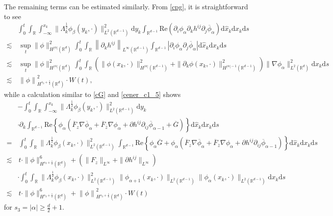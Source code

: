 \documentclass[10pt,twoside,a4paper]{article}
\numberwithin{equation}{section}\allowdisplaybreaks
\def\geq{\geqslant}
\begin{document}
The remaining terms can be estimated similarly. From \eqref{cpg}, it is straightforward to see
\begin{align} \label{cener_c1_6}
	& \int_0^t	\int_{\mathbb{R}} \int_{-\infty}^{x_k} \|\Lambda_k^{\frac 12}\phi_{\beta}(y_k,\cdot)\|^2_{L^2(\mathbb{R}^{d-1})}\mathrm{d} y_k\int_{\mathbb{R}^{d-1}}  \mathrm{Re}\left(\partial_{i} \phi_{\alpha }  \partial_k h^{ij} \partial_j \overline{\phi}_{\alpha }\right) \mathrm{d} \hat{x}_k  \mathrm{d} x_k \mathrm{d} s\nonumber\\
	\lesssim &\,   \sup_t  \|\phi\|^2_{H^{|\alpha|}(\mathbb{R}^{d})}  \int_0^t	\int_{\mathbb{R}} \left\|  \partial_k h^{ij} \right\|_{L^\infty(\mathbb{R}^{d-1})}\int_{\mathbb{R}^{d-1}}  \left|\partial_{i} \phi_{\alpha }  \partial_j \overline{\phi}_{\alpha }\right| \mathrm{d} \hat{x}_k  \mathrm{d} x_k \mathrm{d} s\\
	\lesssim &\, \sup_t  \|\phi\|^2_{H^{|\alpha|}(\mathbb{R}^{d})}\int_0^t	\int_{\mathbb{R}} \left(  \|\phi(x_k,\cdot)\|^2_{H^{|\alpha|}(\mathbb{R}^{d-1})}+\|\partial_k \phi(x_k,\cdot)\|_{H^{|\alpha|-1}(\mathbb{R}^{d-1})}^2\right) \| \nabla\phi_{\alpha}\|^2_{L^2(\mathbb{R}^d)} \mathrm{d} x_k \mathrm{d} s\nonumber\\
	\lesssim &\,\left\|  \phi\right\|_{H^{s_3+\frac 12}(\mathbb{R}^d)}^2 \cdot W (t),\nonumber
\end{align}
while a calculation similar to \eqref{cG} and \eqref{cener_c1_5} shows
\begin{align} \label{cener_c1_7}
	&	- \int_0^t	\int_{\mathbb{R}}\int_{-\infty}^{x_k} \|\Lambda_k^{\frac 12}\phi_{\beta}(y_k,\cdot)\|^2_{L^2(\mathbb{R}^{d-1})}\mathrm{d} y_k\nonumber\\
	&\cdot \partial_k\int_{\mathbb{R}^{d-1}}   \mathrm{Re}  \left\{ \phi_{\alpha } \left(\overline{F}_z\nabla \overline{\phi}_\alpha+\overline{F}_{\overline{z}}\nabla \phi_\alpha+\partial h^{ij}\partial_{ij } \overline{\phi}_{\alpha -1}+\overline{G}\right)  \right\} \mathrm{d} \hat{x}_k  \mathrm{d} x_k \mathrm{d} s\\
	=&\,	\int_0^t	\int_{\mathbb{R}} \|\Lambda_k^{\frac 12}\phi_{\beta}(x_k,\cdot)\|^2_{L^2(\mathbb{R}^{d-1})} \int_{\mathbb{R}^{d-1}}   \mathrm{Re}  \left\{\phi_{\alpha }\overline{G}+ \phi_{\alpha } \left(\overline{F}_z\nabla \overline{\phi}_\alpha+\overline{F}_{\overline{z}}\nabla \phi_\alpha+\partial h^{ij}\partial_{ij } \overline{\phi}_{\alpha -1}\right)  \right\} \mathrm{d} \hat{x}_k  \mathrm{d} x_k \mathrm{d} s\nonumber\\
	\lesssim &\,t\cdot\|\phi\|_{H^{s_3+\frac12}(\mathbb{R}^{d})}^6+\left( \|F_z\|_{L^\infty}+\|\partial h^{ij}\|_{L^\infty}\right) \nonumber\\
	&\cdot\int_0^t	\int_{\mathbb{R}} 	\|\Lambda_k^{\frac 12}\phi_{\beta}(x_k,\cdot)\|^2_{L^2(\mathbb{R}^{d-1})} \|\phi_{\alpha +1} (x_k,\cdot)\|_{L^{2}(\mathbb{R}^{d-1})}\|\phi_{\alpha } (x_k,\cdot)\|_{L^{2}(\mathbb{R}^{d-1})}\mathrm{d} x_k \mathrm{d} s\nonumber\\
	\lesssim &\,t\cdot\|\phi\|_{H^{s_3+\frac12}(\mathbb{R}^{d})}^6+ \left\|  \phi\right\|_{H^{s_3+\frac 12}(\mathbb{R}^d)}^2 \cdot W (t)\nonumber
\end{align}
for $ s_3=|\alpha|\geq \frac{d}{2}+1  $.
\end{document}

